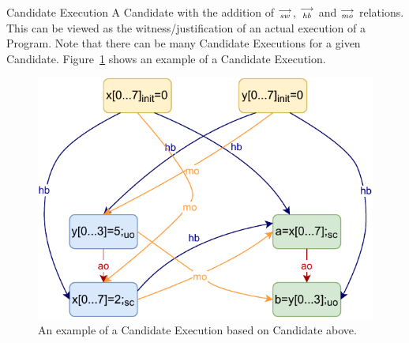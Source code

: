     \begin{definition}{Candidate Execution}
        A Candidate with the addition of $\stackrel{\longrightarrow}{_\textit{sw}}$, $\stackrel{\longrightarrow}{_\textit{hb}}$ and $\stackrel{\longrightarrow}{_\textit{mo}}$ relations. 
        This can be viewed as the witness/justification of an actual execution of a Program. 
        Note that there can be many Candidate Executions for a given Candidate. 
        Figure~\ref{model:candexec} shows an example of a Candidate Execution.  
        \begin{figure}[H]
            \centering
            \includegraphics[scale=0.7]{4.ECMAScriptMemoryModel/CandidateExecution.pdf}
            \caption{An example of a Candidate Execution based on Candidate above.}
            \label{model:candexec}
        \end{figure}
        
    \end{definition}


